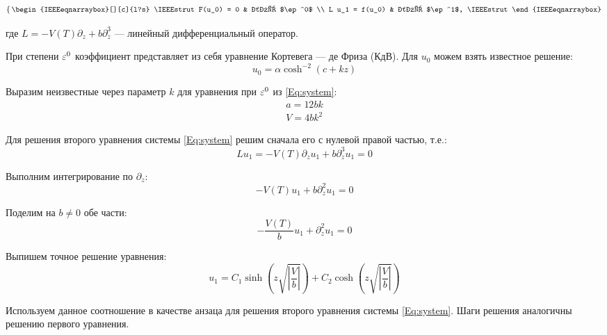 \begin{equation} \label{Eq:system}
    \left\{ \,
    \begin{IEEEeqnarraybox}[][c]{l?s}
        \IEEEstrut
            F(u_0) = 0 & для $\ep^0$ \\
            L u_1 = f(u_0) & для $\ep^1$,
        \IEEEstrut
    \end{IEEEeqnarraybox}
    \right.
\end{equation}

где $L = -V(T) \partial_z + b \partial_z^3$
--- линейный дифференциальный оператор.

При степени $\varepsilon^0$ коэффициент
представляет из себя уравнение Кортевега --- де Фриза (КдВ).
Для $u_0$ можем взять известное решение:
\begin{equation*}
    u_0 = \alpha \cosh^{-2}(c + k z) 
\end{equation*}

Выразим неизвестные через параметр $k$
для уравнения при $\varepsilon^0$ из \eqref{Eq:system}:
\begin{equation*}
    \begin{gathered}
        a = 12 b k \\
        V = 4 b k^2
    \end{gathered}
\end{equation*}

Для решения второго уравнения системы \eqref{Eq:system}
решим сначала его с нулевой правой частью, т.е.:
\begin{equation*}
    L u_1 = -V(T) \partial_z u_1 + b \partial_z^3 u_1 = 0
\end{equation*}

Выполним интегрирование по $\partial_z$:
\begin{equation*}
    -V(T) u_1 + b \partial_z^2 u_1 = 0
\end{equation*}

Поделим на $b \neq 0$ обе части:
\begin{equation*}
    -\frac{V(T)}{b} u_1 + \partial_z^2 u_1 = 0
\end{equation*}

Выпишем точное решение уравнения:
\begin{equation*}
    u_1 = C_1 \sinh(z \sqrt{ \left|\frac{V}{b}\right|} ) +
    C_2 \cosh(z \sqrt{ \left|\frac{V}{b}\right|})
\end{equation*}

Используем данное соотношение в качестве анзаца
для решения второго уравнения системы \eqref{Eq:system}.
Шаги решения аналогичны решению первого уравнения.


